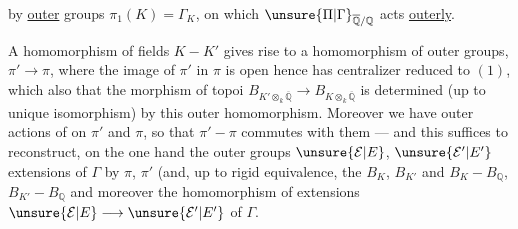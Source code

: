 by  \uline{outer} groups $\pi_1(K)=\Gamma_K$, on which  $\unsure{\Pi|\Gamma}_{\overline{\mathbb Q}/\mathbb Q}$ acts \uline{outerly}.

A homomorphism of fields $K-K'$ gives rise to a homomorphism of outer groups,
 $\pi'\longrightarrow\pi$, where the image of $\pi'$ in $\pi$ is open hence has centralizer reduced to $(1)$, which also  that the morphism of topoi $B_{K'\otimes_k\overline{\mathbb Q}}\longrightarrow B_{K\otimes_k\overline{\mathbb Q}}$ is determined (up to unique isomorphism) by this outer homomorphism. Moreover we have outer actions of  on $\pi'$ and $\pi$, so that $\pi'-\pi$ commutes with them --- and this suffices to reconstruct, on the one hand the outer groups $\unsure{\mathcal E|E}$, $\unsure{\mathcal E'|E'}$ extensions  of $\Gamma$ by $\pi$, $\pi'$ (and, up to rigid equivalence, the $B_K$, $B_{K'}$ and $B_K-B_{\mathbb Q}$, $B_{K'}-B_{\mathbb Q}$ and moreover the homomorphism of extensions  $\unsure{\mathcal E|E}\longrightarrow\unsure{\mathcal E'|E'}$ of $\Gamma$.
